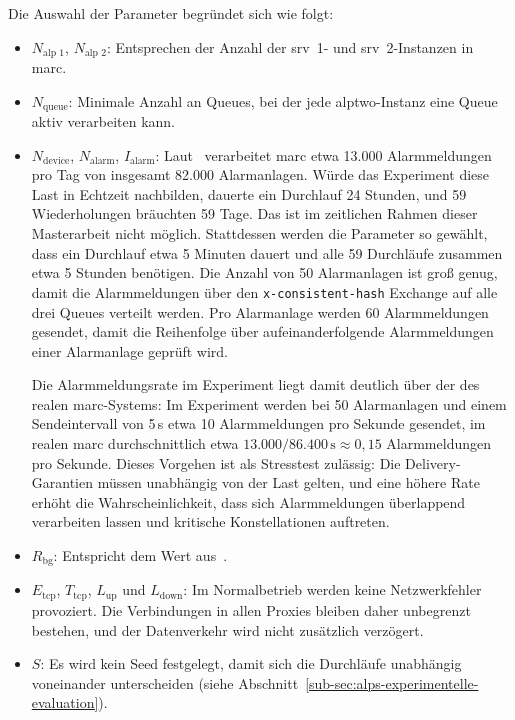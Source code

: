 Die Auswahl der Parameter begründet sich wie folgt:

\begin{itemize}
    \item $N_{\text{alp~1}}$, $N_{\text{alp~2}}$: Entsprechen der Anzahl der \gls{srv}~1- und \gls{srv}~2-Instanzen in \gls{marc}.

    \item $N_{\text{queue}}$: Minimale Anzahl an Queues, bei der jede \gls{alptwo}-Instanz eine Queue aktiv verarbeiten kann.

    \item $N_{\text{device}}$, $N_{\text{alarm}}$, $I_{\text{alarm}}$: Laut~\citep{rast22} verarbeitet \gls{marc} etwa 13.000 Alarmmeldungen pro Tag von insgesamt 82.000 Alarmanlagen. Würde das Experiment diese Last in Echtzeit nachbilden, dauerte ein Durchlauf 24 Stunden, und 59 Wiederholungen bräuchten 59 Tage. Das ist im zeitlichen Rahmen dieser Masterarbeit nicht möglich. Stattdessen werden die Parameter so gewählt, dass ein Durchlauf etwa 5 Minuten dauert und alle 59 Durchläufe zusammen etwa 5 Stunden benötigen. Die Anzahl von 50 Alarmanlagen ist groß genug, damit die Alarmmeldungen über den \texttt{x-consistent-hash} Exchange auf alle drei Queues verteilt werden. Pro Alarmanlage werden 60 Alarmmeldungen gesendet, damit die Reihenfolge über aufeinanderfolgende Alarmmeldungen einer Alarmanlage geprüft wird.

          \newpage

          Die Alarmmeldungsrate im Experiment liegt damit deutlich über der des realen \gls{marc}-Systems: Im Experiment werden bei 50 Alarmanlagen und einem Sendeintervall von 5\,s etwa 10 Alarmmeldungen pro Sekunde gesendet, im realen \gls{marc} durchschnittlich etwa $13.000 / 86.400\,\text{s} \approx 0{,}15$ Alarmmeldungen pro Sekunde. Dieses Vorgehen ist als Stresstest zulässig: Die Delivery-Garantien müssen unabhängig von der Last gelten, und eine höhere Rate erhöht die Wahrscheinlichkeit, dass sich Alarmmeldungen überlappend verarbeiten lassen und kritische Konstellationen auftreten.

    \item $R_{\text{bg}}$: Entspricht dem Wert aus~\citep{rast22}.

    \item $E_{\text{tcp}}$, $T_{\text{tcp}}$, $L_{\text{up}}$ und $L_{\text{down}}$: Im Normalbetrieb werden keine Netzwerkfehler provoziert. Die Verbindungen in allen Proxies bleiben daher unbegrenzt bestehen, und der Datenverkehr wird nicht zusätzlich verzögert.

    \item $S$: Es wird kein Seed festgelegt, damit sich die Durchläufe unabhängig voneinander unterscheiden (siehe Abschnitt~\ref{sub-sec:alps-experimentelle-evaluation}).
\end{itemize}


